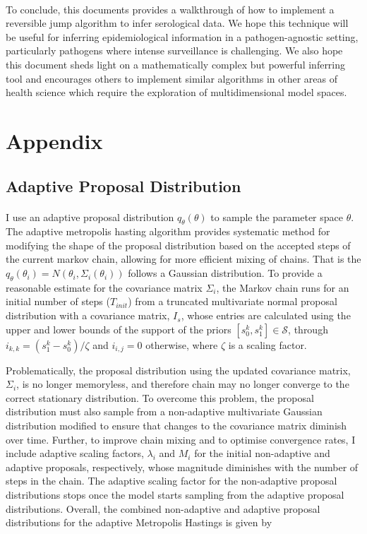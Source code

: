 \documentclass{article}
\begin{document}
\paragraph{}To conclude, this documents provides a walkthrough of how to implement a reversible jump algorithm to infer serological data. We hope this technique will be useful for inferring epidemiological information in a pathogen-agnostic setting, particularly pathogens where intense surveillance is challenging. We also hope this document sheds light on a mathematically complex but powerful inferring tool and encourages others to implement similar algorithms in other areas of health science which require the exploration of multidimensional model spaces. 

\section{Appendix}
\subsection{Adaptive Proposal Distribution}

\paragraph{}I use an adaptive proposal distribution $q_\theta(\theta)$ to sample the parameter space $\theta$. The adaptive metropolis hasting algorithm provides systematic method for modifying the shape of the proposal distribution based on the accepted steps of the current markov chain, allowing for more efficient mixing of chains. That is the $q_\theta(\theta_i) = N(\theta_i, \Sigma_i(\theta_i))$ follows a Gaussian distribution. To provide a reasonable estimate for the covariance matrix $\Sigma_i$, the Markov chain runs for an initial number of steps ($T_{init}$) from a truncated multivariate normal proposal distribution with a covariance matrix, $I_s$, whose entries are calculated using the upper and lower bounds of the support of the priors $[s^k_0, s^k_1] \in \mathcal{S}$, through $i_{k,k} = (s^k_1 - s^k_0)/\zeta$ and $i_{i,j} = 0$ otherwise, where $\zeta$ is a scaling factor.
 
Problematically, the proposal distribution using the updated covariance matrix, $\Sigma_i$, is no longer memoryless, and therefore chain may no longer converge to the correct stationary distribution. To overcome this problem, the proposal distribution must also sample from a non-adaptive multivariate Gaussian distribution modified to ensure that changes to the covariance matrix diminish over time. Further, to improve chain mixing and to optimise convergence rates, I include adaptive scaling factors, $\lambda_i$ and $M_i$ for the initial non-adaptive and adaptive proposals, respectively, whose magnitude diminishes with the number of steps in the chain. The adaptive scaling factor for the non-adaptive proposal distributions stops once the model starts sampling from the adaptive proposal distributions. Overall, the combined non-adaptive and adaptive proposal distributions for the adaptive Metropolis Hastings is given by
\end{document}
